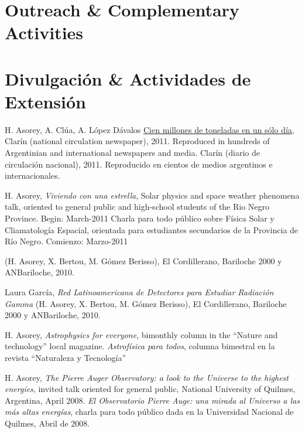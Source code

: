 \ifeng
\section*{Outreach \& Complementary Activities}
\else
\section*{Divulgación \& Actividades de Extensión}
\fi
\noindent
{}H. Asorey, A. Clúa, A. López Dávalos \href{http://www.clarin.com/sociedad/Cien-millones-toneladas-cenizas-solo_0_517148395.html}{Cien millones de toneladas en un sólo día}, 
\ifeng
Clarín (national circulation newspaper), 2011. Reproduced in hundreds of Argentinian and international newspapers and media.
\else
Clarín (diario de circulación nacional), 2011. Reproducido en cientos de medios argentinos e internacionales.
\fi

H. Asorey, {\emph{Viviendo con una estrella}}, 
\ifeng 
Solar physics and space weather phenomena talk, oriented to general public and high-school students of the Rio Negro Province. Begin: March-2011
\else
Charla para todo público sobre Física Solar y Cliamatología Espacial, orientada para estudiantes secundarios de la Provincia de Río Negro. Comienzo: Marzo-2011
\fi

 (H. Asorey, X. Bertou, M. Gómez Berisso), El Cordillerano, Bariloche 2000 y ANBariloche, 2010.

Laura García, {\emph{Red Latinoamericana de Detectores para Estudiar Radiación Gamma}} (H. Asorey, X. Bertou, M. Gómez Berisso), El Cordillerano, Bariloche 2000 y ANBariloche, 2010.

H. Asorey, 
\ifeng
{\emph{Astrophysics for everyone}}, bimonthly column in the ``Nature and technology'' local magazine. \else
{\emph{Astrofísica para todos}}, columna bimestral en la revista ``Naturaleza y Tecnología''
\fi

H. Asorey, 
\ifeng
{\emph{The Pierre Auger Observatory: a look to the Universe to the highest energies}}, invited talk oriented for general public, National University of Quilmes, Argentina, April 2008.
\else
{\emph{El Observatorio Pierre Auge: una mirada al Universo a las más altas energías}}, charla para todo público dada en la Universidad Nacional de Quilmes, Abril de 2008.
\fi
